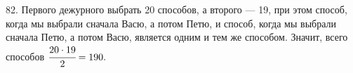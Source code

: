 82. Первого дежурного выбрать 20 способов, а второго --- 19, при этом способ, когда мы выбрали сначала Васю, а потом Петю, и способ, когда мы выбрали сначала Петю, а потом Васю, является одним и тем же способом. Значит, всего способов $\cfrac{20\cdot19}{2}=190.$\\
